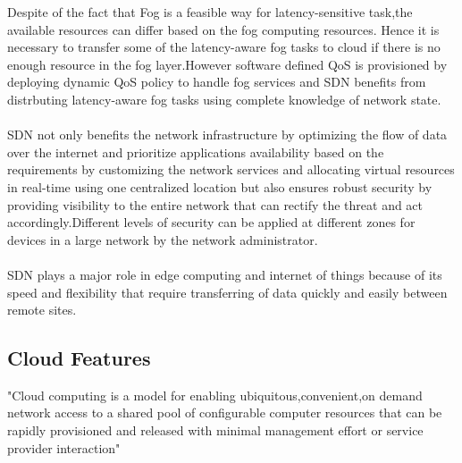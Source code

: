 Despite of the fact that Fog is a feasible way for latency-sensitive task\cite{11},the available resources can differ based on the fog computing resources. Hence it is necessary to transfer some of the latency-aware fog tasks to cloud if there is no enough resource in the fog layer\cite{11}.However software defined QoS is provisioned by deploying dynamic QoS policy to handle fog services and SDN benefits from distrbuting latency-aware fog tasks using complete knowledge of network state.\\ \\
SDN not only benefits the network infrastructure by optimizing the flow of data over the internet and prioritize applications availability based on the requirements by customizing the network services and allocating virtual resources in real-time using one centralized location but also ensures robust security by providing visibility to the entire network that can rectify the threat and act accordingly.Different levels of security can be applied at different zones for devices in a large network by the network administrator.\\ \\
SDN plays a major role in edge computing and internet of things because of its speed and flexibility that require transferring of data quickly and easily between remote sites.

\newpage
\subsection{Cloud Features}
"Cloud computing is a model for enabling ubiquitous,convenient,on demand network access to a shared pool of configurable computer resources that can be rapidly provisioned and released with minimal management effort or service provider interaction\cite{mell2011nist}"\\


